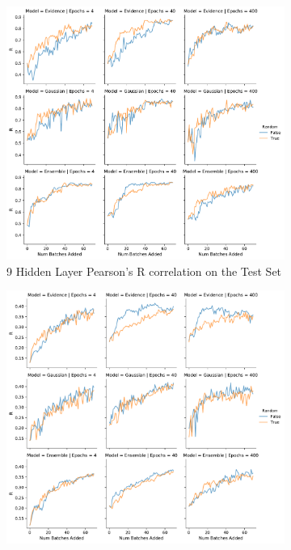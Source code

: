 \documentclass[journal=jmcmar,manuscript=article]{achemso}
\begin{document}
\begin{figure}[tbph]
    \centering
    \begin{subfigure}[b]{0.48\textwidth}
        \includegraphics[width=1\linewidth]{figures/fig10_morgan_nh9_molbatch_R.pdf}
        \caption{9 Hidden Layer Pearson's R correlation on the Test Set}
    \end{subfigure}%
    \hfill
    \begin{subfigure}[b]{0.48\textwidth}
        \includegraphics[width=1\linewidth]{figures/fig10_morgan_nh9_molbatch_rest_R.pdf}

\end{subfigure}
\end{figure}
\end{document}
